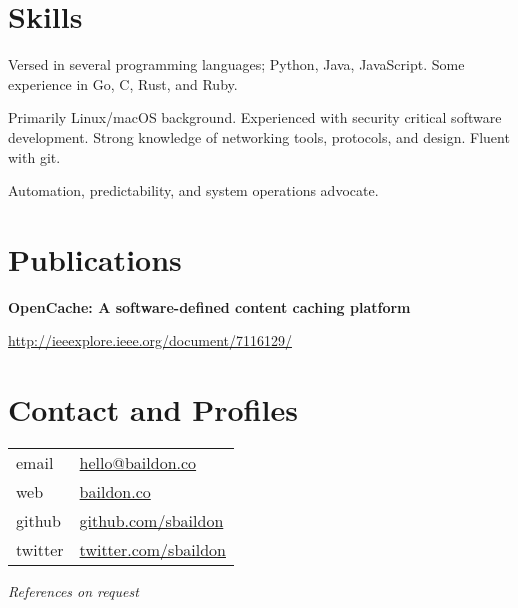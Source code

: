 \documentclass[a4paper,12pt]{article}
\begin{document}
\begin{multicols*}{2}
\section*{Skills}
Versed in several programming languages; Python, Java, JavaScript. Some experience in Go, C, Rust, and Ruby.\medskip

Primarily Linux/macOS background. Experienced with security critical software development. Strong knowledge of networking tools, protocols, and design.  Fluent with git.\medskip

Automation, predictability, and system operations advocate.

\section*{Publications}
\textbf{OpenCache: A software-defined content caching platform}\par
\url{http://ieeexplore.ieee.org/document/7116129/}

\section*{Contact and Profiles}
\noindent \begin{tabular}{@{}ll}
email & \href{mailto:hello@baildon.co}{hello@baildon.co} \\
web & \href{https://baildon.co}{baildon.co} \\
github & \href{https://github.com/sbaildon}{github.com/sbaildon} \\
twitter & \href{https://twitter.com/sbaildon}{twitter.com/sbaildon}
\end{tabular}

\vspace{4ex}
\textit{References on request}

\end{multicols*}
\end{document}
